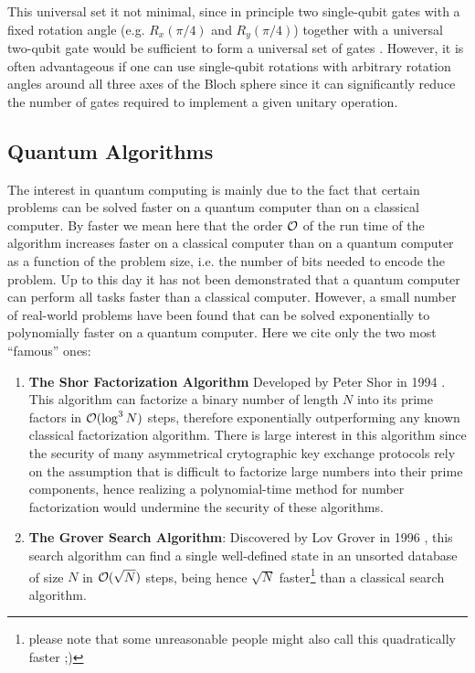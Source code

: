 This universal set it not minimal, since in principle two single-qubit gates with a fixed rotation angle (e.g. $R_x(\pi/4)$ and $R_y(\pi/4)$) together with a universal two-qubit gate would be sufficient to form a universal set of gates \citep{dawson_solovay-kitaev_2005}. However, it is often advantageous if one can use single-qubit rotations with arbitrary rotation angles around all three axes of the Bloch sphere since it can significantly reduce the number of gates required to implement a given unitary operation.

\subsection{Quantum Algorithms}

The interest in quantum computing is mainly due to the fact that certain problems can be solved faster on a quantum computer than on a classical computer. By faster we mean here that the order $\cal{O}$ of the run time of the algorithm increases faster on a classical computer than on a quantum computer as a function of the problem size, i.e. the number of bits needed to encode the problem. Up to this day it has not been demonstrated that a quantum computer can perform all tasks faster than a classical computer. However, a small number of real-world problems have been found that can be solved exponentially to polynomially faster on a quantum computer. Here we cite only the two most ``famous'' ones:

\begin{enumerate}
\item \textbf{The Shor Factorization Algorithm} Developed by Peter Shor in 1994 \citep{shor_algorithms_1994,shor_polynomial-time_1995}. This algorithm can factorize a binary number of length $N$ into its prime factors in $\begin{mathcal}O\end{mathcal}(\log^3{N})$ steps, therefore exponentially outperforming any known classical factorization algorithm. There is large interest in this algorithm since the security of many asymmetrical crytographic key exchange protocols rely on the assumption that is difficult to factorize large numbers into their prime components, hence realizing a polynomial-time method for number factorization would undermine the security of these algorithms.
\item \textbf{The Grover Search Algorithm}: Discovered by Lov Grover in 1996 \citep{grover_fast_1996}, this search algorithm can find a single well-defined state in an unsorted database of size $N$ in $\begin{mathcal}O\end{mathcal}(\sqrt{N})$ steps, being hence $\sqrt{N}$ faster\footnote{please note that some unreasonable people might also call this quadratically faster ;)} than a classical search algorithm.
\end{enumerate}

